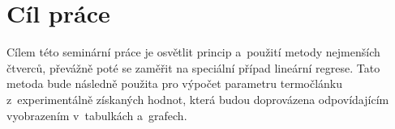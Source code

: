 \section{Cíl práce}
Cílem této seminární práce je osvětlit princip a~použití metody nejmenších
čtverců, převážně poté se zaměřit na speciální případ lineární regrese. Tato
metoda bude následně použita pro výpočet parametru termočlánku z~experimentálně
získaných hodnot, která budou doprovázena odpovídajícím vyobrazením v~tabulkách
a~grafech. 
